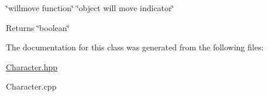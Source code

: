 \char`\"{}willmove function\char`\"{}  \char`\"{}object will move indicator\char`\"{} 

\begin{DoxyReturn}{Returns}
\char`\"{}boolean\char`\"{} 
\end{DoxyReturn}


The documentation for this class was generated from the following files\+:\begin{DoxyCompactItemize}
\item 
\hyperlink{Character_8hpp}{Character.\+hpp}\item 
Character.\+cpp\end{DoxyCompactItemize}
